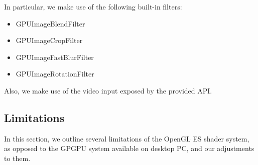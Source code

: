 In particular, we make use of the following built-in filters: 
\begin{itemize}
 \item  GPUImageBlendFilter
 \item   GPUImageCropFilter
 \item GPUImageFastBlurFilter
 \item GPUImageRotationFilter
\end{itemize} 
Also, we make use of the video input exposed by the provided API. 

\subsection{Limitations}
\label{gpulim}
In this section, we outline several limitations of the OpenGL ES shader system,  as opposed to the GPGPU system available on desktop PC, and our adjustments to them.

